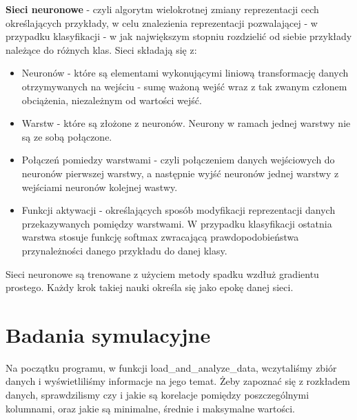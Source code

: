 \documentclass[11pt, a4paper, notitlepage]{report}
\begin{document}
	{\bf Sieci neuronowe} - czyli algorytm wielokrotnej zmiany reprezentacji cech określających przykłady, w celu znalezienia reprezentacji pozwalającej - w przypadku klasyfikacji - w jak największym stopniu rozdzielić od siebie przykłady należące do różnych klas. Sieci składają się z:
	\begin{itemize}
	  \item Neuronów - które są elementami wykonującymi liniową transformację danych otrzymywanych na wejściu - sumę ważoną wejść wraz z tak zwanym członem obciążenia, niezależnym od wartości wejść.
	  \item Warstw - które są złożone z neuronów. Neurony w ramach jednej warstwy nie są ze sobą połączone.
	  \item Połączeń pomiedzy warstwami - czyli połączeniem danych wejściowych do neuronów pierwszej warstwy, a następnie wyjść neuronów jednej warstwy z wejściami neuronów kolejnej wastwy.
	 \item Funkcji aktywacji - określających sposób modyfikacji reprezentacji danych przekazywanych pomiędzy warstwami. W przypadku klasyfikacji ostatnia warstwa stosuje funkcję softmax zwracającą prawdopodobieństwa przynależności danego przykładu do danej klasy.
	\end{itemize}
	Sieci neuronowe są trenowane z użyciem metody spadku wzdłuż gradientu prostego. Każdy krok takiej nauki określa się jako epokę danej sieci.
\section{Badania symulacyjne}

Na początku programu, w funkcji load\_and\_analyze\_data, wczytaliśmy zbiór danych i wyświetliliśmy informacje na jego temat.
Żeby zapoznać się z rozkładem danych, sprawdzilismy czy i jakie są korelacje pomiędzy poszczególnymi kolumnami, oraz jakie są minimalne, średnie i maksymalne wartości.
\end{document}
